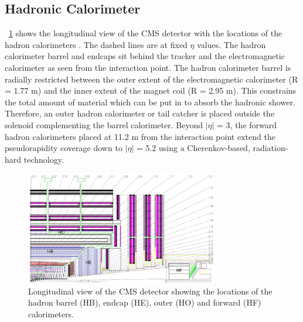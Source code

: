 \subsection{Hadronic Calorimeter}
\figurename~\ref{HCAL_layout} shows the longitudinal view of the CMS detector with the locations of the hadron calorimeters \cite{HCAL}. The dashed lines are at fixed $\eta$ values. The hadron calorimeter barrel and endcaps sit behind the tracker and the electromagnetic calorimeter as seen from the interaction point. The hadron calorimeter barrel is radially restricted between the outer extent of the electromagnetic calorimeter (R = 1.77 m) and the inner extent of the magnet coil (R = 2.95 m). This constrains the total amount of material which can be put in to absorb the hadronic shower. Therefore, an outer hadron calorimeter or tail catcher is placed outside the solenoid complementing the barrel calorimeter. Beyond $|\eta|$ = 3, the forward hadron calorimeters placed at 11.2 m from the interaction point extend the pseudorapidity coverage down to $|\eta|$ = 5.2 using a Cherenkov-based, radiation-hard technology. 
\begin{figure}[htbp]
\centering
\includegraphics[width=0.75\textwidth]{Images/HCAL_layout}
\caption{Longitudinal view of the CMS detector showing the locations of the hadron barrel (HB), endcap (HE), outer (HO) and forward (HF) calorimeters.}
\label{HCAL_layout}
\end{figure}
